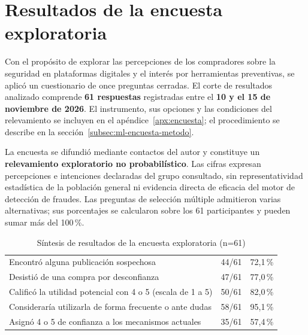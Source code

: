 
\section{Resultados de la encuesta exploratoria}
\label{sec:ml-resultados-encuesta}

Con el propósito de explorar las percepciones de los compradores sobre la seguridad en plataformas digitales y el interés por herramientas preventivas, se aplicó un cuestionario de once preguntas cerradas. El corte de resultados analizado comprende \textbf{61 respuestas} registradas entre el \textbf{10 y el 15 de noviembre de 2026}. El instrumento, sus opciones y las condiciones del relevamiento se incluyen en el apéndice~\ref{apx:encuesta}; el procedimiento se describe en la sección~\ref{subsec:ml-encuesta-metodo}.

La encuesta se difundió mediante contactos del autor y constituye un \textbf{relevamiento exploratorio no probabilístico}. Las cifras expresan percepciones e intenciones declaradas del grupo consultado, sin representatividad estadística de la población general ni evidencia directa de eficacia del motor de detección de fraudes. Las preguntas de selección múltiple admitieron varias alternativas; sus porcentajes se calcularon sobre los 61 participantes y pueden sumar más del 100\,\%.

\begin{table}[H]
\centering
\caption{Síntesis de resultados de la encuesta exploratoria (n=61)}
\label{tab:ml-encuesta-principales}
\small
\begin{tabularx}{\textwidth}{L r r}
\toprule
{} &  &  \\
\midrule
Encontró alguna publicación sospechosa & 44/61 & 72,1\,\% \\
Desistió de una compra por desconfianza & 47/61 & 77,0\,\% \\
Calificó la utilidad potencial con 4 o 5 (escala de 1 a 5) & 50/61 & 82,0\,\% \\
Consideraría utilizarla de forma frecuente o ante dudas & 58/61 & 95,1\,\% \\
Asignó 4 o 5 de confianza a los mecanismos actuales & 35/61 & 57,4\,\% \\
\bottomrule
\end{tabularx}
\end{table}


